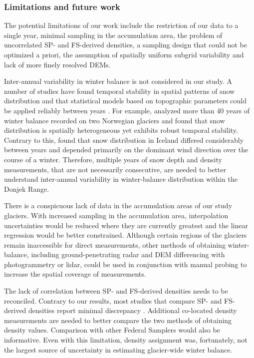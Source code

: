 \documentclass[review,oneside, letterpaper]{igs}
\begin{document}
\subsubsection{Limitations and future work}


The potential limitations of our work include the restriction of our data to a single year, minimal sampling in the accumulation area, the problem of uncorrelated SP- and FS-derived densities, a sampling design that could not be optimized a priori, the assumption of spatially uniform subgrid variability and lack of more finely resolved DEMs.

Inter-annual variability in winter balance is not considered in our study. A number of studies have found temporal stability in spatial patterns of snow distribution and that statistical models based on topographic parameters could be applied reliably between years \citep[e.g.][]{Grunewald2013}. For example, \cite{Walmsley2015} analyzed more than 40 years of winter balance recorded on two Norwegian glaciers and found that snow distribution is spatially heterogeneous yet exhibits robust temporal stability. Contrary to this, \cite{Crochet2007} found that snow distribution in Iceland differed considerably between years and depended primarily on the dominant wind direction over the course of a winter. Therefore, multiple years of snow depth and density measurements, that are not necessarily consecutive, are needed to better understand inter-annual variability in winter-balance distribution within the Donjek Range.

There is a conspicuous lack of data in the accumulation areas of our study glaciers. With increased sampling in the accumulation area, interpolation uncertainties would be reduced where they are currently greatest and the linear regression would be better constrained. Although certain regions of the glaciers remain inaccessible for direct measurements, other methods of obtaining winter-balance, including ground-penetrating radar and DEM differencing with photogrammetry or lidar, could be used in conjunction with manual probing to increase the spatial coverage of measurements.

The lack of correlation between SP- and FS-derived densities needs to be reconciled. Contrary to our results, most studies that compare SP- and FS-derived densities report minimal discrepancy \citep[e.g.][and sources within]{Dixon2012}. Additional co-located density measurements are needed to better compare the two methods of obtaining density values. Comparison with other Federal Samplers would also be informative. Even with this limitation, density assignment was, fortunately, not the largest source of uncertainty in estimating glacier-wide winter balance. 
\end{document}
